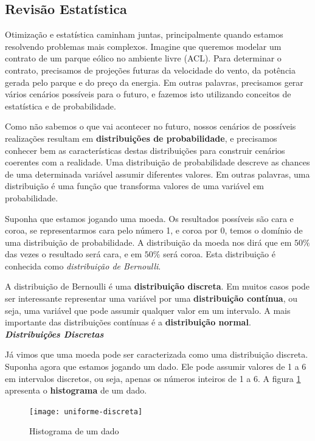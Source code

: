 \subsection{Revisão Estatística}

Otimização e estatística caminham juntas, principalmente quando estamos resolvendo problemas mais complexos. Imagine que queremos modelar um contrato de um parque eólico no ambiente livre (ACL). Para determinar o contrato, precisamos de projeções futuras da velocidade do vento, da potência gerada pelo parque e do preço da energia. Em outras palavras, precisamos gerar vários cenários possíveis para o futuro, e fazemos isto utilizando conceitos de estatística e de probabilidade. 

Como não sabemos o que vai acontecer no futuro, nossos cenários de possíveis realizações resultam em \textbf{distribuições de probabilidade}, e precisamos conhecer bem as características destas distribuições para construir cenários coerentes com a realidade. Uma distribuição de probabilidade descreve as chances de uma determinada variável assumir diferentes valores. Em outras palavras, uma distribuição é uma função que transforma valores de uma variável em probabilidade. 

Suponha que estamos jogando uma moeda. Os resultados possíveis são cara e coroa, se representarmos cara pelo número 1, e coroa por 0, temos o domínio de uma distribuição de probabilidade. A distribuição da moeda nos dirá que em $50\%$ das vezes o resultado será cara, e em $50\%$ será coroa. Esta distribuição é conhecida como \textit{distribuição de Bernoulli}.

A distribuição de Bernoulli é uma \textbf{distribuição discreta}. Em muitos casos pode ser interessante representar uma variável por uma \textbf{distribuição contínua}, ou seja, uma variável que pode assumir qualquer valor em um intervalo. A mais importante das distribuições contínuas é a \textbf{distribuição normal}. 
\\

\textbf{\textit{Distribuições Discretas}}


Já vimos que uma moeda pode ser caracterizada como uma distribuição discreta. Suponha agora que estamos jogando um dado. Ele pode assumir valores de 1 a 6 em intervalos discretos, ou seja, apenas os números inteiros de 1 a 6. A figura \ref{fig:prob1} apresenta o \textbf{histograma} de um dado. 

\begin{figure}[H]
\begin{centering}
\texttt{[image: uniforme-discreta]}\protect\caption{\label{fig:prob1}Histograma de um dado}
\end{centering}
\end{figure}

